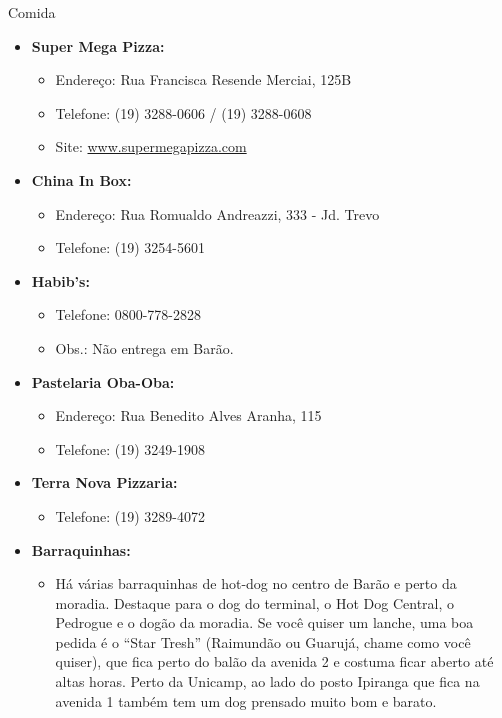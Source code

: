 \begin{story}{Comida}
\begin{itemize}
\item \textbf{Super Mega Pizza:}
\begin{itemize}
\item Endereço: Rua Francisca Resende Merciai, 125B
\item Telefone: (19) 3288-0606 / (19) 3288-0608
\item Site: \url{www.supermegapizza.com}
\end{itemize}

\item \textbf{China In Box:}
\begin{itemize}
\item Endereço: Rua Romualdo Andreazzi, 333 - Jd. Trevo
\item Telefone: (19) 3254-5601
\end{itemize}

\item \textbf{Habib's:}
\begin{itemize}
\item Telefone: 0800-778-2828
\item Obs.: Não entrega em Barão.
\end{itemize}

\item \textbf{Pastelaria Oba-Oba:}
\begin{itemize}
\item Endereço: Rua Benedito Alves Aranha, 115
\item Telefone: (19) 3249-1908
\end{itemize}

\item \textbf{Terra Nova Pizzaria:}
\begin{itemize}
\item Telefone: (19) 3289-4072
\end{itemize}

\item \textbf{Barraquinhas:}
\begin{itemize}
\item Há várias barraquinhas de hot-dog no centro de Barão e perto da moradia. Destaque para o dog do terminal, o Hot Dog Central, o Pedrogue e o dogão da moradia. Se você quiser um lanche, uma boa pedida é o ``Star Tresh'' (Raimundão ou Guarujá, chame como você quiser), que fica perto do balão da avenida 2 e costuma ficar aberto até altas horas. Perto da Unicamp, ao lado do posto Ipiranga que fica na avenida 1 também tem um dog prensado muito bom e barato.
\end{itemize}


\end{itemize}
\end{story}
